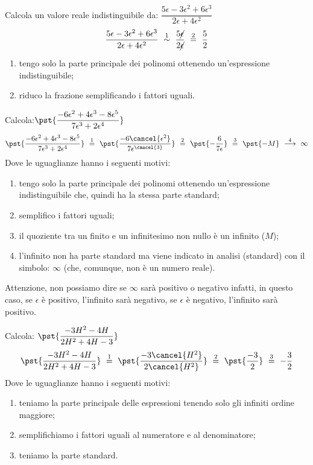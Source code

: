 \begin{esempio}
Calcola un valore reale indistinguibile da: \quad
\(\dfrac{5\epsilon -3 \epsilon^2 + 6 \epsilon^3}
         {2\epsilon + 4 \epsilon^2}\)
\[\dfrac{5\epsilon -3 \epsilon^2 + 6 \epsilon^3}
         {2\epsilon + 4 \epsilon^2} 
~ \stackrel{1}{\sim} ~
  \dfrac{5 \cancel{\epsilon}}{2 \cancel{\epsilon}} 
~ \stackrel{2}{=} ~
  \dfrac{5}{2}\]
\begin{enumerate} [nosep]
 \item tengo solo la parte principale dei polinomi ottenendo un'espressione 
indistinguibile;
 \item riduco la frazione semplificando i fattori uguali.
\end{enumerate}
\end{esempio}

\begin{esempio}
Calcola:\quad \(\pst{\dfrac{-6\epsilon^2 +4 \epsilon^3 -8 \epsilon^5}
             {7\epsilon^3 + 2 \epsilon^4}}\)
\[\pst{\dfrac{-6\epsilon^2 +4 \epsilon^3 -8 \epsilon^5}
             {7\epsilon^3 + 2 \epsilon^4}} 
~ \stackrel{1}{=} ~
  \pst{\dfrac{-6\cancel{\epsilon^2}}
             {7\epsilon^{\cancel{3}}}} 
~ \stackrel{2}{=} ~
  \pst{-\dfrac{6}{7\epsilon}}  
~ \stackrel{3}{=} ~
  \pst{-M} 
~ \stackrel{4}{\longrightarrow} ~
  \infty\]
Dove le uguaglianze hanno i seguenti motivi:
\begin{enumerate} [nosep]
 \item tengo solo la parte principale dei polinomi ottenendo un'espressione 
indistinguibile che, quindi ha la stessa parte standard;
 \item semplifico i fattori uguali;
 \item il quoziente tra un finito e un infinitesimo non nullo è un 
infinito (\(M\));
 \item l'infinito non ha parte standard ma viene indicato in analisi 
(standard) con il simbolo: \(\infty\) (che, comunque, non è un numero reale).
\end{enumerate}
\begin{osservazione}
 Attenzione, non possiamo dire se \(\infty\) sarà positivo o negativo 
infatti, in questo caso, se \(\epsilon\) è positivo, l'infinito sarà 
negativo,  se \(\epsilon\) è negativo, l'infinito sarà positivo.
\end{osservazione}
\end{esempio}

\begin{esempio}
Calcola: \quad \(\pst{\dfrac{-3H^2 -4H}{2H^2 +4H -3}}\)
\[\pst{\dfrac{-3H^2 -4H}{2H^2 +4H -3}} 
~ \stackrel{1}{=} ~
  \pst{\dfrac{-3\cancel{H^2}}{2\cancel{H^2}}} 
~ \stackrel{2}{=} ~
  \pst{\dfrac{-3}{2}} 
~ \stackrel{3}{=} ~
  -\dfrac{3}{2}\]
Dove le uguaglianze hanno i seguenti motivi:
\begin{enumerate} [nosep]
 \item teniamo la parte principale delle espressioni tenendo solo gli 
infiniti ordine maggiore; 
 \item semplifichiamo i fattori uguali al numeratore e al denominatore; 
 \item teniamo la parte standard.
\end{enumerate}
\end{esempio}

